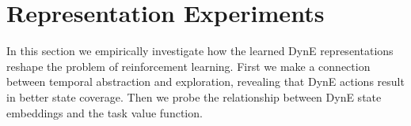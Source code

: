 \section{Representation Experiments}

In this section we empirically investigate how the learned DynE representations reshape the problem of reinforcement learning.
First we make a connection between temporal abstraction and exploration, revealing that DynE actions result in better state coverage.
Then we probe the relationship between DynE state embeddings and the task value function.





